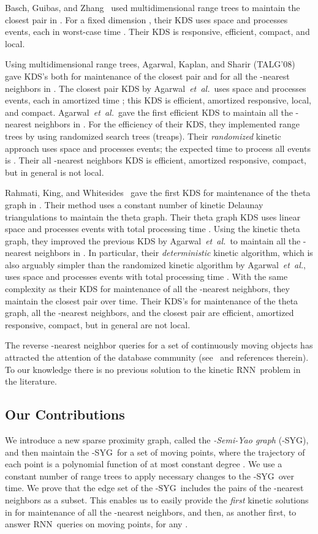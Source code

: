\documentclass[preprint,12pt]{elsarticle}
\def\rknn{\mbox{RNN}}
\def\ksyg{\mbox{-SYG}}
\newcommand{\etal}{\emph{et~al.}}
\begin{document}
Basch, Guibas, and Zhang~\cite{Basch:1997:PPM:262839.262998} used multidimensional range trees to maintain the closest pair in . For a fixed dimension , their KDS uses  space and processes  events, each in worst-case time . Their KDS is responsive, efficient, compact, and local.

Using multidimensional range trees, Agarwal, Kaplan, and Sharir (TALG'08)~\cite{Agarwal:2008:KDD:1435375.1435379} gave KDS's both for maintenance of the closest pair and for all the -nearest neighbors in . The closest pair KDS by Agarwal~\etal~uses  space and processes  events, each in amortized time ; this KDS is efficient, amortized responsive, local, and compact. Agarwal~\etal~gave the first efficient KDS to maintain all the -nearest neighbors in . For the efficiency of their KDS, they implemented range trees by using randomized search trees (treaps). Their \textit{randomized} kinetic approach uses  space and processes  events; the expected time to process all events is . Their all -nearest neighbors KDS is efficient, amortized responsive, compact, but in general is not local.

Rahmati, King, and Whitesides~\cite{Rahmati2014} gave the first KDS for maintenance of the theta graph in . Their method uses a constant number of kinetic Delaunay triangulations to maintain the theta graph. Their theta graph KDS uses linear space and processes  events with total processing time . Using the kinetic theta graph, they improved the previous KDS by Agarwal~\etal~to maintain all the -nearest neighbors in . In particular, their \textit{deterministic} kinetic algorithm, which is also arguably simpler than the randomized kinetic algorithm by Agarwal~\etal, uses  space and processes  events with total processing time . With the same complexity as their KDS for maintenance of all the -nearest neighbors, they maintain the closest pair over time. Their KDS's for maintenance of the theta graph, all the -nearest neighbors, and the closest pair are efficient, amortized responsive, compact, but in general are not local.

The reverse -nearest neighbor queries for a set of continuously moving objects has attracted the attention of the database community (see~\cite{Cheema:2012:CRK:2124885.2124903} and references therein). To our knowledge there is no previous solution to the kinetic \rknn~problem in the literature.
\subsection{Our Contributions}\label{sec:Contributions} 
We introduce a new sparse proximity graph, called the \textit{-Semi-Yao graph} (\ksyg), and then maintain the \ksyg~for a set of  moving points, where the trajectory of each point is a polynomial function of at most constant degree . We use a constant number of range trees to apply necessary changes to the \ksyg~over time. We prove that the edge set of the \ksyg~includes the pairs of the -nearest neighbors as a subset. This enables us to easily provide the \textit{first} kinetic solutions in  for maintenance of all the -nearest neighbors, and then, as another first, to answer \rknn~queries on moving points, for any .
\end{document}
